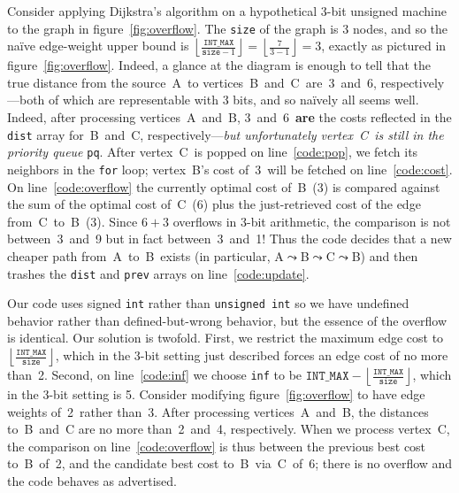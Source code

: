 Consider applying Dijkstra's algorithm on a hypothetical 3-bit unsigned machine to 
the graph in figure~\ref{fig:overflow}.  The \texttt{size} of the graph is 3 nodes, and so the na\"ive edge-weight upper bound is $\left\lfloor\frac{\texttt{INT\_MAX}}{\texttt{size}-1}\right\rfloor = \left\lfloor\frac{7}{3-1}\right\rfloor = 3$, exactly as pictured in figure~\ref{fig:overflow}.  Indeed, a glance at the diagram is enough to tell that the true distance from the source~A~to vertices~B~and~C~are~3~and~6, respectively---both of which are representable with 3 bits, and so na\"ively all seems well.  %
Indeed, after processing vertices~A~and~B, 3~and~6~\textbf{are} the costs reflected in the \texttt{dist} array for~B~and~C, respectively---\emph{but unfortunately vertex~C~is still in the priority queue} \texttt{pq}.  After vertex~C~is popped on line~\ref{code:pop}, we fetch its neighbors in the \texttt{for} loop; vertex~B's cost of~3~will be fetched on line~\ref{code:cost}.  On line~\ref{code:overflow} the currently optimal cost of~B~(3) is compared against the sum of the optimal cost of~C~(6) plus the just-retrieved cost of the edge from~C~to~B~(3).  Since $6+3$ overflows in 3-bit arithmetic, the comparison is not between~3~and~9 but in fact between~3~and~1!  Thus the code decides that a new cheaper path from~A~to~B~exists (in particular, A$\leadsto$B$\leadsto$C$\leadsto$B) and then trashes the \texttt{dist} and \texttt{prev} arrays on line~\ref{code:update}.  %

Our code uses signed \texttt{int} rather than \texttt{unsigned int} so we have undefined behavior rather than defined-but-wrong behavior, but the essence of the overflow is identical.
Our solution is twofold.  First, we restrict the maximum edge cost to $\left\lfloor\frac{\texttt{INT\_MAX}}{\texttt{size}}\right\rfloor$, which in the 3-bit setting just described forces an edge cost of no more than~2.  Second, on line~\ref{code:inf} we choose \texttt{inf} to be $\texttt{INT\_MAX} - \left\lfloor \frac{\texttt{INT\_MAX}}{\texttt{size}} \right\rfloor$, which in the 3-bit setting is 5.  Consider modifying figure~\ref{fig:overflow} to
have edge weights of~2~rather than~3.  After processing vertices~A~and~B, the distances to~B~and~C are no more than~2~and~4, respectively.  When we process vertex~C, the comparison on line~\ref{code:overflow} is thus between the previous best cost to~B~of~2, and the candidate best cost to~B~via~C~of~6; there is no overflow and the code behaves as advertised.

